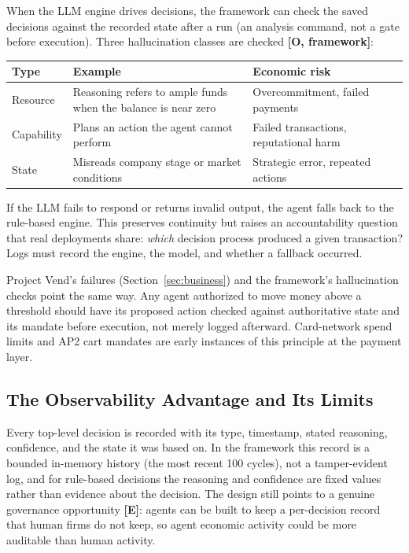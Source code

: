 \documentclass[11pt,letterpaper]{article}
\begin{document}
When the LLM engine drives decisions, the framework can check the saved decisions against the recorded state after a run (an analysis command, not a gate before execution). Three hallucination classes are checked \textbf{[O, framework]}:
\begin{center}
\small
\begin{tabularx}{\linewidth}{ZY{0.57}Y{1.2}Y{1.23}}
\toprule
\textbf{Type} & \textbf{Example} & \textbf{Economic risk} \\
\midrule
Resource & Reasoning refers to ample funds when the balance is near zero & Overcommitment, failed payments \\
Capability & Plans an action the agent cannot perform & Failed transactions, reputational harm \\
State & Misreads company stage or market conditions & Strategic error, repeated actions \\
\bottomrule
\end{tabularx}
\end{center}

If the LLM fails to respond or returns invalid output, the agent falls back to the rule-based engine. This preserves continuity but raises an accountability question that real deployments share: \textit{which} decision process produced a given transaction? Logs must record the engine, the model, and whether a fallback occurred.

\begin{keybox}
Project Vend's failures (Section~\ref{sec:business}) and the framework's hallucination checks point the same way. Any agent authorized to move money above a threshold should have its proposed action checked against authoritative state and its mandate before execution, not merely logged afterward. Card-network spend limits and AP2 cart mandates are early instances of this principle at the payment layer.
\end{keybox}

\subsection{The Observability Advantage and Its Limits}

Every top-level decision is recorded with its type, timestamp, stated reasoning, confidence, and the state it was based on. In the framework this record is a bounded in-memory history (the most recent 100 cycles), not a tamper-evident log, and for rule-based decisions the reasoning and confidence are fixed values rather than evidence about the decision. The design still points to a genuine governance opportunity \textbf{[E]}: agents can be built to keep a per-decision record that human firms do not keep, so agent economic activity could be more auditable than human activity.
\end{document}

